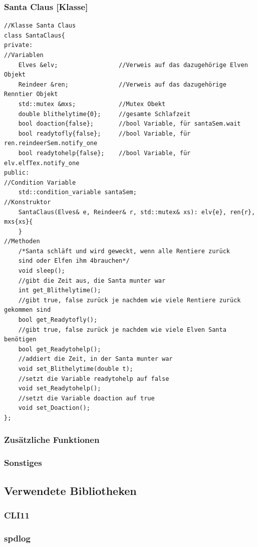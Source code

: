 \documentclass[a4paper,12pt]{exam}
\begin{document}
\subsubsection{Santa Claus [Klasse]}
\begin{verbatim}
//Klasse Santa Claus
class SantaClaus{
private:
//Variablen
    Elves &elv;                 //Verweis auf das dazugehörige Elven Objekt
    Reindeer &ren;              //Verweis auf das dazugehörige Renntier Objekt
    std::mutex &mxs;            //Mutex Obekt
    double blithelytime{0};     //gesamte Schlafzeit
    bool doaction{false};       //bool Variable, für santaSem.wait
    bool readytofly{false};     //bool Variable, für ren.reindeerSem.notify_one       
    bool readytohelp{false};    //bool Variable, für elv.elfTex.notify_one
public:
//Condition Variable
    std::condition_variable santaSem;
//Konstruktor
    SantaClaus(Elves& e, Reindeer& r, std::mutex& xs): elv{e}, ren{r}, mxs{xs}{
    }
//Methoden
    /*Santa schläft und wird geweckt, wenn alle Rentiere zurück 
    sind oder Elfen ihm 4brauchen*/
    void sleep();      
    //gibt die Zeit aus, die Santa munter war         
    int get_Blithelytime(); 
    //gibt true, false zurück je nachdem wie viele Rentiere zurück gekommen sind
    bool get_Readytofly(); 
    //gibt true, false zurück je nachdem wie viele Elven Santa benötigen
    bool get_Readytohelp();
    //addiert die Zeit, in der Santa munter war
    void set_Blithelytime(double t);
    //setzt die Variable readytohelp auf false
    void set_Readytohelp();
    //setzt die Variable doaction auf true
    void set_Doaction();
};
\end{verbatim}
\newpage
\subsubsection{Zusätzliche Funktionen}
\subsubsection{Sonstiges}

\subsection{Verwendete Bibliotheken}
\subsubsection{CLI11}
\subsubsection{spdlog}
\end{document}

